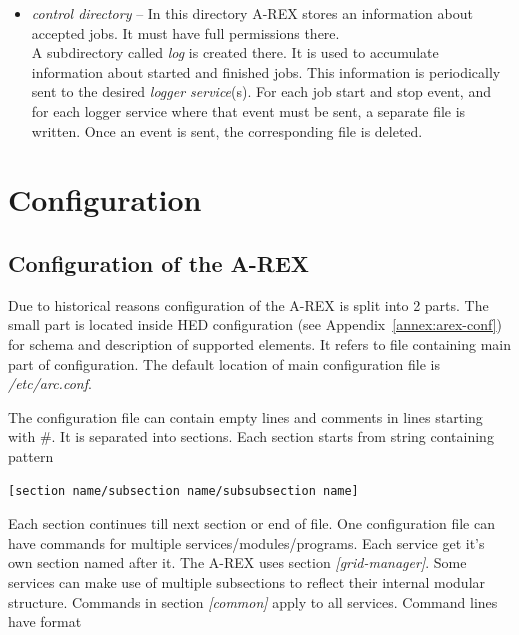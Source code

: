 \documentclass{article}                            %
\begin{document}

\begin{itemize}
\item \textit{control directory} -- In this directory A-REX stores an information
about accepted jobs. It must have full permissions there.\\
A subdirectory called \textit{log} is created there. It is used to
accumulate information about started and finished jobs. This information
is periodically sent to the desired \emph{logger service}(s). For
each job start and stop event, and for each logger service where that
event must be sent, a separate file is written. Once an event is sent,
the corresponding file is deleted.
\end{itemize}

\section{Configuration}

\subsection{Configuration of the A-REX\label{SubSection:ConfigFile}}

Due to historical reasons configuration of the A-REX is split into
2 parts. The small part is located inside HED configuration (see Appendix~\ref{annex:arex-conf}) for schema and description of supported elements. It refers to
file containing main part of configuration. The default location of
main configuration file is \textit{/etc/arc.conf}.

The configuration file can contain empty lines and comments in lines
starting with \#. It is separated into sections. Each section starts
from string containing pattern

\begin{shaded}
\verb|[section name/subsection name/subsubsection name]|
\end{shaded}

Each section continues till next section or end of file. One configuration
file can have commands for multiple services/modules/programs. Each
service get it's own section named after it. The A-REX uses section
\emph{{[}grid-manager]}. Some services can make use of multiple subsections
to reflect their internal modular structure. Commands in section \emph{{[}common]}
apply to all services. Command lines have format 
\end{document}
